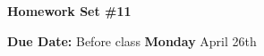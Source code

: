 
\usepackage{braket}

\def\ketY{\ensuremath{\ket {\Psi}}}
\def\iGeV{\ensuremath{\textrm{GeV}^{-1}}}
\def\mp{\ensuremath{m_{\textrm{proton}}}}
\def\rp{\ensuremath{r_{\textrm{proton}}}}
\def\me{\ensuremath{m_{\textrm{electron}}}}
\def\aG{\ensuremath{\alpha_G}}
\def\rAtom{\ensuremath{r_{\textrm{atom}}}}
\def\rNucl{\ensuremath{r_{\textrm{nucleus}}}}
\def\GN{\ensuremath{\textrm{G}_\textrm{N}}}

\def\be{\begin{equation*}}
\def\ee{\end{equation*}}


\usepackage{fancyhdr}
\usepackage{cancel}
\usepackage{ mathrsfs }





\fancyhf{}

\thispagestyle{fancy}






\begin{center}
{\huge \textbf{Homework Set \#11 }}
\large

{\textbf{ Due Date:} Before class {\textbf{Monday}} April 26th  } 
\end{center}

